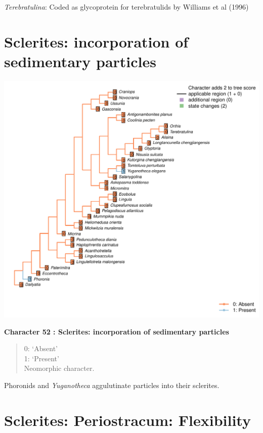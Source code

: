 \documentclass[]{book}
\theoremstyle{definition}
\theoremstyle{definition}
\theoremstyle{definition}
\theoremstyle{remark}
\begin{document}
\emph{Terebratulina}: Coded as glycoprotein for terebratulids by
Williams et al (1996)

\hypertarget{sclerites-incorporation-of-sedimentary-particles}{%
\section*{Sclerites: incorporation of sedimentary
particles}\label{sclerites-incorporation-of-sedimentary-particles}}

\includegraphics{Brachiopod_phylogeny_files/figure-latex/unnamed-chunk-5-52.pdf}

\textbf{Character 52 : Sclerites: incorporation of sedimentary particles
}

\begin{quote}
0: `Absent'\\
1: `Present'\\
Neomorphic character.
\end{quote}

Phoronids and \emph{Yuganotheca} aggulutinate particles into their
sclerites.

\hypertarget{sclerites-periostracum-flexibility}{%
\section*{Sclerites: Periostracum:
Flexibility}\label{sclerites-periostracum-flexibility}}
\end{document}
